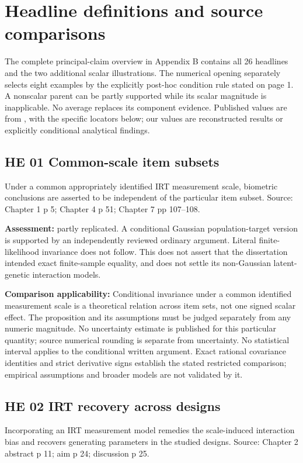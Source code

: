 \documentclass[11pt]{article}
\begin{document}
\appendix
\section{Headline definitions and source comparisons}\label{sec:definitions}
The complete principal-claim overview in Appendix B contains all 26 headlines and the two additional scalar illustrations. The numerical opening separately selects eight examples by the explicitly post-hoc condition rule stated on page 1. A nonscalar parent can be partly supported while its scalar magnitude is inapplicable. No average replaces its component evidence. Published values are from \citet{schwabe2016}, with the specific locators below; our values are reconstructed results or explicitly conditional analytical findings.
\subsection{HE 01 Common-scale item subsets}\label{head:HE01}
Under a common appropriately identified IRT measurement scale, biometric conclusions are asserted to be independent of the particular item subset. Source: Chapter 1 p 5; Chapter 4 p 51; Chapter 7 pp 107--108.

\textbf{Assessment:} partly replicated. A conditional Gaussian population-target version is supported by an independently reviewed ordinary argument. Literal finite-likelihood invariance does not follow. This does not assert that the dissertation intended exact finite-sample equality, and does not settle its non-Gaussian latent-genetic interaction models.

\textbf{Comparison applicability:} Conditional invariance under a common identified measurement scale is a theoretical relation across item sets, not one signed scalar effect. The proposition and its assumptions must be judged separately from any numeric magnitude. No uncertainty estimate is published for this particular quantity; source numerical rounding is separate from uncertainty. No statistical interval applies to the conditional written argument. Exact rational covariance identities and strict derivative signs establish the stated restricted comparison; empirical assumptions and broader models are not validated by it.
\subsection{HE 02 IRT recovery across designs}\label{head:HE02}
Incorporating an IRT measurement model remedies the scale-induced interaction bias and recovers generating parameters in the studied designs. Source: Chapter 2 abstract p 11; aim p 24; discussion p 25.
\end{document}
